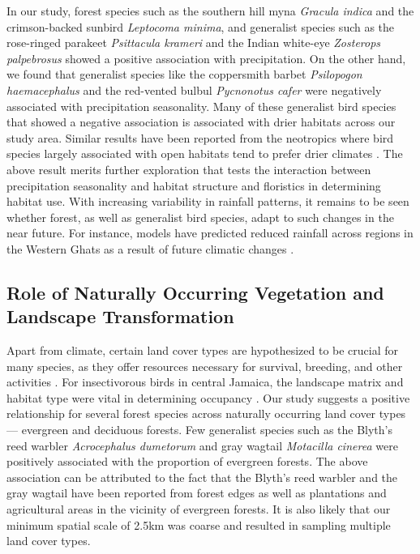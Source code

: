 In our study, forest species such as the southern hill myna \textit{Gracula indica} and the crimson-backed sunbird \textit{Leptocoma minima}, and generalist species such as the rose-ringed parakeet \textit{Psittacula krameri} and the Indian white-eye \textit{Zosterops palpebrosus} showed a positive association with precipitation.
On the other hand, we found that generalist species like the coppersmith barbet \textit{Psilopogon haemacephalus} and the red-vented bulbul \textit{Pycnonotus cafer} were negatively associated with precipitation seasonality.
Many of these generalist bird species that showed a negative association is associated with drier habitats across our study area.
Similar results have been reported from the neotropics where bird species largely associated with open habitats tend to prefer drier climates \citep{frishkoff2016}.
The above result merits further exploration that tests the interaction between precipitation seasonality and habitat structure and floristics in determining habitat use.
With increasing variability in rainfall patterns, it remains to be seen whether forest, as well as generalist bird species, adapt to such changes in the near future.
For instance, models have predicted reduced rainfall across regions in the Western Ghats as a result of future climatic changes \citep{rajendran2012}.

\subsection*{Role of Naturally Occurring Vegetation and Landscape Transformation}

Apart from climate, certain land cover types are hypothesized to be crucial for many species, as they offer resources necessary for survival, breeding, and other activities \citep{sunarto2012}.
For insectivorous birds in central Jamaica, the landscape matrix and habitat type were vital in determining occupancy \citep{kennedy2011}.
Our study suggests a positive relationship for several forest species across naturally occurring land cover types --- evergreen and deciduous forests.
Few generalist species such as the Blyth's reed warbler \textit{Acrocephalus dumetorum} and gray wagtail \textit{Motacilla cinerea} were positively associated with the proportion of evergreen forests.
The above association can be attributed to the fact that the Blyth's reed warbler and the gray wagtail have been reported from forest edges as well as plantations and agricultural areas in the vicinity of evergreen forests.
It is also likely that our minimum spatial scale of 2.5km was coarse and resulted in sampling multiple land cover types.

